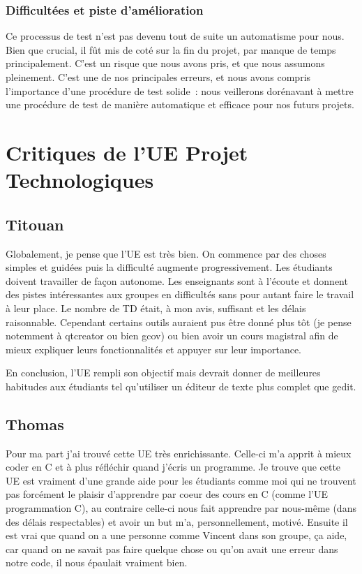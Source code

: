 \documentclass[12]{article}
\begin{document}
\subsubsection{Difficultées et piste d'amélioration}
Ce processus de test n’est pas devenu tout de suite un automatisme pour nous. Bien que crucial, il fût mis de coté sur la fin du projet, par manque de temps principalement. C’est un risque que nous avons pris, et que nous assumons pleinement. C’est une de nos principales erreurs, et nous avons compris l’importance d’une procédure de test solide : nous veillerons dorénavant à mettre une procédure de test de manière automatique et efficace pour nos futurs projets.



\section{Critiques de l'UE Projet Technologiques}
\subsection{Titouan}
Globalement, je pense que l'UE est très bien. On commence par des choses simples et guidées puis la difficulté augmente progressivement. Les étudiants doivent travailler de façon autonome. Les enseignants sont à l'écoute et donnent des pistes intéressantes aux groupes en difficultés sans pour autant faire le travail à leur place. Le nombre de TD était, à mon avis, suffisant et les délais raisonnable. Cependant certains outils auraient pus être donné plus tôt (je pense notemment à qtcreator ou bien gcov) ou bien avoir un cours magistral afin de mieux expliquer leurs fonctionnalités et appuyer sur leur importance.

En conclusion, l'UE rempli son objectif mais devrait donner de meilleures habitudes aux étudiants tel qu'utiliser un éditeur de texte plus complet que gedit.

\subsection{Thomas}
Pour ma part j'ai trouvé cette UE très enrichissante. Celle-ci m'a apprit à mieux coder en C et à plus réfléchir quand j'écris un programme. Je trouve que cette UE est vraiment d'une grande aide pour les étudiants comme moi qui ne trouvent pas forcément le plaisir d'apprendre par coeur des cours en C (comme l'UE programmation C), au contraire celle-ci nous fait apprendre par nous-même (dans des délais respectables) et avoir un but m'a, personnellement, motivé. Ensuite il est vrai que quand on a une personne comme Vincent dans son groupe, ça aide, car quand on ne savait pas faire quelque chose ou qu'on avait une erreur dans notre code, il nous épaulait vraiment bien.
\end{document}

